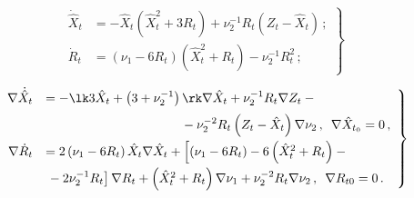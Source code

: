 \begin{equation}

\left.

\begin{array}{rl}

\dot{\hat X}_t &= - \hat X_t \left( \hat X_t^2 + 3 R_t\right) + \nu_2^{-1} R_t 

\left(Z_t - \hat X_t\right)\,;\\[6pt]

\dot R_t &= \left(\nu_1 - 6 R_t\right) \left( \hat X_t^2 + R_t\right) - 

\nu_2^{-1} R_t^2\,; %

\end{array}

\right\}

\label{e7.3-s1}

\end{equation}

\begin{equation}

\left.

\begin{array}{rl}

\nabla \dot{\hat X}_t &= - \lk 3\hat X_t +\left(3 + \nu_2^{-1} \right)\rk 

\nabla\hat X_t+ \nu_2^{-1} R_t \nabla Z_t -{}\\[6pt]

&\hspace*{37.5mm}{}-

 \nu_2^{-2} R_t \left(Z_t -\hat X_t\right)

    \nabla \nu_2\,,\enskip

\nabla \hat X_{t_0}=0\,, %

\\[6pt]

\nabla \dot R_t &= 2\left(\nu_1 - 6 R_t\right) \hat X_t \nabla \hat X_t + \left[ 

\left(\nu_1 - 6 R_t\right) - 6 \left(\hat X_t^2 + R_t\right) -{}\right.\\[6pt]

&\left.{}- 2 \nu_2^{-1} R_t\right] \nabla R_t + \left(\hat X_t^2 + R_t\right) \nabla \nu_1 + \nu_2^{-2}R_t \nabla \nu_2\,,\enskip 

\nabla R_{t0}=0\,.

\end{array}

\right\}

\label{e7.6-s1}

\end{equation}



